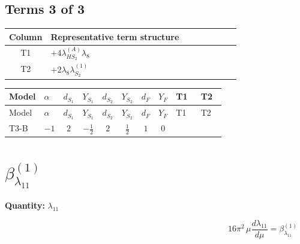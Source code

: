 \documentclass[8pt]{article}
\begin{document}
\begin{landscape}
\subsection*{Terms 3 of 3}
\begin{center}
\begin{tabular}{@{}c >{\raggedright\arraybackslash}p{0.82\linewidth}@{}}
\toprule
Column & Representative term structure \\
\midrule
T1 & \(\displaystyle +4 {\lambda_{HS_2}^{(A)}} {\lambda_{8}}\) \\
\midrule
T2 & \(\displaystyle +2 {\lambda_{8}} {\lambda_{S_2}^{(1)}}\) \\
\midrule
\bottomrule
\end{tabular}
\end{center}
\smallskip
\tiny
\begin{longtable}{@{}llcccccc >{\raggedright\arraybackslash}p{0.21\linewidth} >{\raggedright\arraybackslash}p{0.21\linewidth}@{}}
\toprule
Model & $\alpha$ & $d_{S_1}$ & $Y_{S_1}$ & $d_{S_2}$ & $Y_{S_2}$ & $d_F$ & $Y_F$ & T1 & T2 \\
\midrule
\endfirsthead
\toprule
Model & $\alpha$ & $d_{S_1}$ & $Y_{S_1}$ & $d_{S_2}$ & $Y_{S_2}$ & $d_F$ & $Y_F$ & T1 & T2 \\
\midrule
\endhead
T3-B & $-1$ & $2$ & $-\frac{1}{2}$ & $2$ & $\frac{1}{2}$ & $1$ & $0$ & \scriptsize\adjustbox{max width=\linewidth}{$\begin{gathered} +4 {\lambda_{HS_2}^{(A)}} {\lambda_{8}}\end{gathered}$} & \scriptsize\adjustbox{max width=\linewidth}{$\begin{gathered} +2 {\lambda_{8}} {\lambda_{S_2}^{(1)}}\end{gathered}$} \\
\midrule
\bottomrule
\end{longtable}
\clearpage
\section*{$\beta_{\lambda_{11}}^{(1)}$}
\noindent\textbf{Quantity: }$\lambda_{11}$\par\smallskip
\[16\pi^2\,\mu\frac{d \lambda_{11}}{d\mu}=\beta_{\lambda_{11}}^{(1)}\]

\end{landscape}
\end{document}
